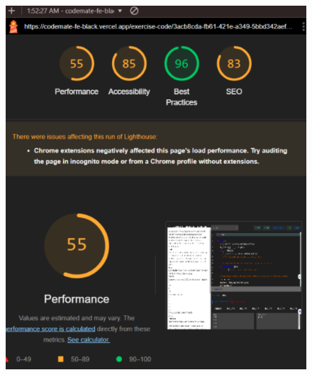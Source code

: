 \begin{figure}[H]
\begin{minipage}{0.45\textwidth}
  \includegraphics[width=\linewidth]{images/lighthouse_code.png}
\end{minipage}

\vspace{1em}


\end{figure}
